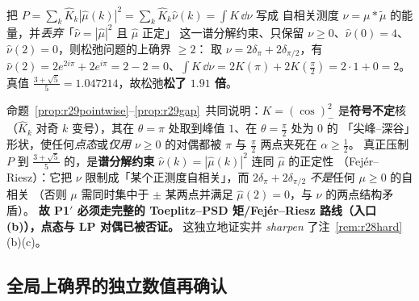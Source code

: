 \begin{proposition}[自相关松弛的缺口，已证（构造）]\label{prop:r29gap}
把 $P=\sum_k\widehat K_k|\widehat\mu(k)|^2=\sum_k\widehat K_k\widehat\nu(k)=\int K\,\dd\nu$ 写成
自相关测度 $\nu=\mu*\widetilde\mu$ 的能量，并\emph{丢弃}「$\widehat\nu=|\widehat\mu|^2$ 且 $\widehat\mu$ 正定」
这一谱分解约束、只保留 $\nu\ge0$、$\widehat\nu(0)=4$、$\widehat\nu(2)=0$，则松弛问题的上确界 $\ge2$：
取 $\nu=2\delta_\pi+2\delta_{\pi/2}$，有 $\widehat\nu(2)=2e^{2i\pi}+2e^{i\pi}=2-2=0$、$\int K\,\dd\nu=2K(\pi)+2K(\tfrac\pi2)=2\cdot1+0=2$。
真值 $\frac{3+\sqrt5}5=1.047214$，故松弛\textbf{松了 $1.91$ 倍}。
\end{proposition}
\begin{remark}[根本原因]\label{rem:r29rootcause}
命题~\ref{prop:r29pointwise}--\ref{prop:r29gap}~共同说明：$K=(\cos)_-^2$ 是\textbf{符号不定}核
（$\widehat K_k$ 对奇 $k$ 变号），其在 $\theta=\pi$ 处取到峰值 $1$、在 $\theta=\frac\pi2$ 处为 $0$ 的
「尖峰--深谷」形状，使任何\emph{点态}或\emph{仅用 $\nu\ge0$} 的对偶都被 $\pi$ 与 $\frac\pi2$ 两点夹死在 $\alpha\ge\frac12$。
真正压制 $P$ 到 $\frac{3+\sqrt5}5$ 的，是\textbf{谱分解约束} $\widehat\nu(k)=|\widehat\mu(k)|^2$ 连同 $\widehat\mu$ 的正定性
（Fejér--Riesz）：它把 $\nu$ 限制成「某个正测度自相关」，而 $2\delta_\pi+2\delta_{\pi/2}$ \emph{不是}任何 $\mu\ge0$ 的自相关
（否则 $\mu$ 需同时集中于 $\pm$ 某两点并满足 $\widehat\mu(2)=0$，与 $\nu$ 的两点结构矛盾）。
\textbf{故 P1$'$ 必须走完整的 Toeplitz--PSD 矩/Fejér--Riesz 路线（入口 (b)），点态与 LP 对偶已被否证。}
这独立地证实并\emph{ sharpen }了注~\ref{rem:r28hard}(b)(c)。
\end{remark}

\subsection{全局上确界的独立数值再确认}\label{sec:r29:num}

